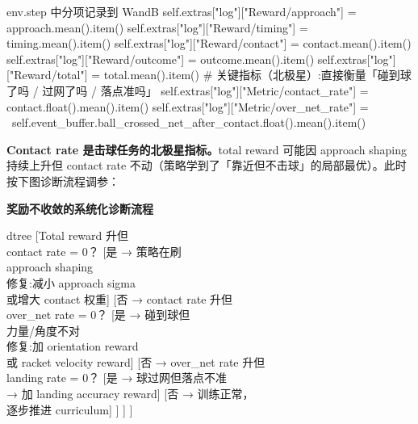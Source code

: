 \begin{codebox}[Python]{env.step 中分项记录到 WandB}
self.extras["log"]["Reward/approach"] = approach.mean().item()
self.extras["log"]["Reward/timing"] = timing.mean().item()
self.extras["log"]["Reward/contact"] = contact.mean().item()
self.extras["log"]["Reward/outcome"] = outcome.mean().item()
self.extras["log"]["Reward/total"] = total.mean().item()
# 关键指标（北极星）:直接衡量「碰到球了吗 / 过网了吗 / 落点准吗」
self.extras["log"]["Metric/contact_rate"] = contact.float().mean().item()
self.extras["log"]["Metric/over_net_rate"] = \
    self.event_buffer.ball_crossed_net_after_contact.float().mean().item()
\end{codebox}

\textbf{Contact rate 是击球任务的北极星指标。}total reward 可能因 approach shaping 持续上升但 contact rate 不动（策略学到了「靠近但不击球」的局部最优）。此时按下图诊断流程调参：

\begin{center}
\small\textbf{奖励不收敛的系统化诊断流程}\\[3pt]
\begin{forest} dtree
[{Total reward 升但\\contact rate = 0？}
  [{是 → 策略在刷\\approach shaping\\修复:减小 approach sigma\\或增大 contact 权重}]
  [{否 → contact rate 升但\\over\_net rate = 0？}
    [{是 → 碰到球但\\力量/角度不对\\修复:加 orientation reward\\或 racket velocity reward}]
    [{否 → over\_net rate 升但\\landing rate = 0？}
      [{是 → 球过网但落点不准\\→ 加 landing accuracy reward}]
      [{否 → 训练正常，\\逐步推进 curriculum}]
    ]
  ]
]
\end{forest}
\end{center}


